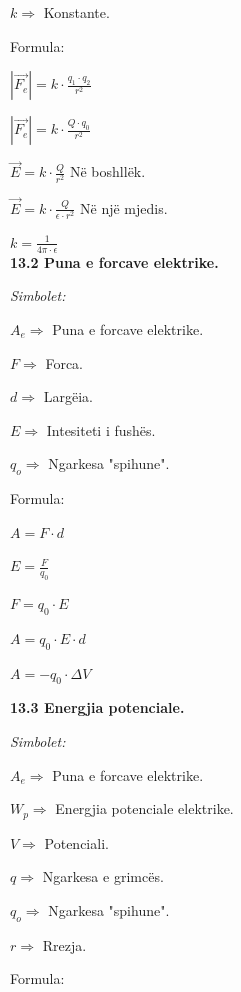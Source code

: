 \documentclass[twocolumn]{article}
\begin{document}
	$k \Rightarrow $ Konstante.
	
	\begin{center}
		Formula:
	\end{center}
	
	$|\vec{F_e}|=k \cdot \frac{q_1 \cdot q_2}{r^2}$
	
	$|\vec{F_e}|=k \cdot \frac{Q \cdot q_0}{r^2}$
	
	$\vec{E}=k \cdot \frac{Q}{r^2}$ Në boshllëk.
	
	$\vec{E}=k \cdot \frac{Q}{\epsilon \cdot r^2}$ Në një mjedis.
	
	$k=\frac{1}{4 \pi \cdot \epsilon}$\\
	
	
	\textbf{13.2 Puna e forcave elektrike.}
	\begin{center}
		\textit{Simbolet:}
	\end{center}
	
	$A_e \Rightarrow $ Puna e forcave elektrike.
	
	$F \Rightarrow $ Forca.
	
	$d \Rightarrow $ Largëia.
	
	$E \Rightarrow $ Intesiteti i fushës.
	
	$q_o \Rightarrow $ Ngarkesa "spihune".
	
	\begin{center}
		Formula:
	\end{center}
	
	$A=F \cdot d$
	
	$E=\frac{F}{q_0}$
	
	$F=q_0 \cdot E$
	
	$A=q_0 \cdot E \cdot d$
	
	$A=-q_0 \cdot \Delta V$
	
	
	
	
	\textbf{13.3 Energjia potenciale.}
	
	\begin{center}
		\textit{Simbolet:}
	\end{center}
	
	$A_e \Rightarrow $ Puna e forcave elektrike.
	
	$W_p \Rightarrow$ Energjia potenciale elektrike.
	
	$V \Rightarrow$ Potenciali.
	
	$q \Rightarrow $ Ngarkesa e grimcës.
	
	$q_o \Rightarrow $ Ngarkesa "spihune".
	
	$r \Rightarrow $ Rrezja.
	
	\begin{center}
		Formula:
	\end{center}
	
\end{document}
